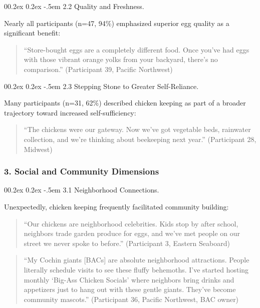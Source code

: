 \documentclass[
  man,
  floatsintext,
  longtable,
  nolmodern,
  notxfonts,
  notimes,
  colorlinks=true,linkcolor=blue,citecolor=blue,urlcolor=blue]{apa7}
\makeatletter
\renewcommand{\paragraph}{\@startsection{paragraph}{4}{\parindent}%
	{0\baselineskip \@plus 0.2ex \@minus 0.2ex}%
	{-.5em}%
	{\normalfont\normalsize\bfseries\typesectitle}}
\makeatother
\begin{document}
\paragraph{2.2 Quality and Freshness.}\label{quality-and-freshness}

Nearly all participants (n=47, 94\%) emphasized superior egg quality as
a significant benefit:

\begin{quote}
``Store-bought eggs are a completely different food. Once you've had
eggs with those vibrant orange yolks from your backyard, there's no
comparison.'' (Participant 39, Pacific Northwest)
\end{quote}

\paragraph{2.3 Stepping Stone to Greater
Self-Reliance.}\label{stepping-stone-to-greater-self-reliance}

Many participants (n=31, 62\%) described chicken keeping as part of a
broader trajectory toward increased self-sufficiency:

\begin{quote}
``The chickens were our gateway. Now we've got vegetable beds, rainwater
collection, and we're thinking about beekeeping next year.''
(Participant 28, Midwest)
\end{quote}

\subsubsection{3. Social and Community
Dimensions}\label{social-and-community-dimensions}

\paragraph{3.1 Neighborhood
Connections.}\label{neighborhood-connections}

Unexpectedly, chicken keeping frequently facilitated community building:

\begin{quote}
``Our chickens are neighborhood celebrities. Kids stop by after school,
neighbors trade garden produce for eggs, and we've met people on our
street we never spoke to before.'' (Participant 3, Eastern Seaboard)
\end{quote}

\begin{quote}
``My Cochin giants {[}BACs{]} are absolute neighborhood attractions.
People literally schedule visits to see these fluffy behemoths. I've
started hosting monthly `Big-Ass Chicken Socials' where neighbors bring
drinks and appetizers just to hang out with these gentle giants. They've
become community mascots.'' (Participant 36, Pacific Northwest, BAC
owner)
\end{quote}
\end{document}
